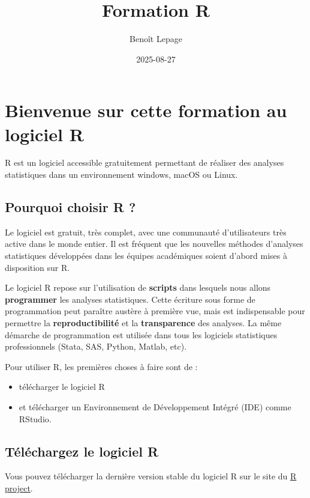 \documentclass[
]{book}
\title{Formation R}
\author{Benoît Lepage}
\date{2025-08-27}
\providecommand{\tightlist}{%
  \setlength{\itemsep}{0pt}\setlength{\parskip}{0pt}}
\begin{document}
\maketitle

{
\setcounter{tocdepth}{1}
\tableofcontents
}
\chapter{Bienvenue sur cette formation au logiciel R}\label{bienvenue-sur-cette-formation-au-logiciel-r}

R est un logiciel accessible gratuitement permettant de réaliser des analyses statistiques dans un environnement windows, macOS ou Linux.

\section{Pourquoi choisir R ?}\label{pourquoi-choisir-r}

Le logiciel est gratuit, très complet, avec une communauté d'utilisateurs très active dans le monde entier. Il est fréquent que les nouvelles méthodes d'analyses statistiques développées dans les équipes académiques soient d'abord mises à disposition sur R.

Le logiciel R repose sur l'utilisation de \textbf{scripts} dans lesquels nous allons \textbf{programmer} les analyses statistiques. Cette écriture sous forme de programmation peut paraître austère à première vue, mais est indispensable pour permettre la \textbf{reproductibilité} et la \textbf{transparence} des analyses. La même démarche de programmation est utilisée dans tous les logiciels statistiques professionnels (Stata, SAS, Python, Matlab, etc).

Pour utiliser R, les premières choses à faire sont de :

\begin{itemize}
\tightlist
\item
  télécharger le logiciel R
\item
  et télécharger un Environnement de Développement Intégré (IDE) comme RStudio.
\end{itemize}

\section{Téléchargez le logiciel R}\label{tuxe9luxe9chargez-le-logiciel-r}

Vous pouvez télécharger la dernière version stable du logiciel R sur le site du \href{https://www.r-project.org/}{R project}.
\end{document}
